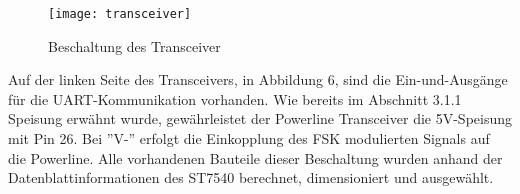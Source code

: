 \begin{figure}[h]
\centering
\texttt{[image: transceiver]}
\caption{Beschaltung des Transceiver}
\end{figure}

Auf der linken Seite des Transceivers, in Abbildung 6, sind die Ein-und-Ausgänge für die UART-Kommunikation vorhanden. Wie bereits im Abschnitt 3.1.1 Speisung erwähnt wurde, gewährleistet der Powerline Transceiver die 5V-Speisung mit Pin 26.
Bei ''V-'' erfolgt die Einkopplung des FSK modulierten Signals auf die Powerline. Alle vorhandenen Bauteile dieser Beschaltung wurden anhand der Datenblattinformationen des ST7540 berechnet, dimensioniert und ausgewählt.
